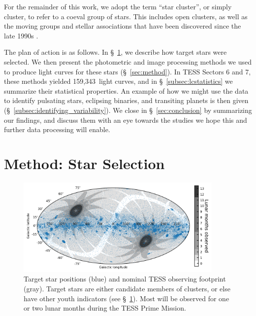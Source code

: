 \documentclass[12pt,twocolumn,tighten]{aastex62}
\newcommand{\numberlcs}{159{,}343\ } %
\begin{document}
For the remainder of this work, we adopt the term ``star cluster'', or
simply cluster, to refer to a coeval group of stars.  This includes
open clusters, as well as the moving groups and stellar associations
that have been discovered since the late 1990s
\citep{zuckerman_young_2004}. 

The plan of action is as follows. In \S~\ref{sec:starselection}, we
describe how target stars were selected. We then present the
photometric and image processing methods we used to produce light
curves for these stars (\S~\ref{sec:method}).  In TESS Sectors 6 and
7, these methods yielded \numberlcs light curves, and in
\S~\ref{subsec:lcstatistics} we summarize their statistical properties.
An example of how we might use the data to identify pulsating stars,
eclipsing binaries, and transiting planets is then given
(\S~\ref{subsec:identifying_variability}).  We close in
\S~\ref{sec:conclusion} by summarizing our findings, and discuss them
with an eye towards the studies we hope this and further data
processing will enable.


\section{Method: Star Selection}
\label{sec:starselection}

\begin{figure}[!t]
	\begin{center}
		\leavevmode
		\includegraphics[width=0.9\textwidth]{target_star_positions.png}
	\end{center}
	\vspace{-0.5cm}
	\caption{
    Target star positions (blue) and nominal TESS observing
    footprint (gray).  Target stars are either candidate members of
    clusters, or else have other youth indicators (see
    \S~\ref{sec:starselection}).  Most will be observed for one or two
    lunar months during the TESS Prime Mission.
    \label{fig:cdips_targets_positions}
	}
\end{figure}
\end{document}
